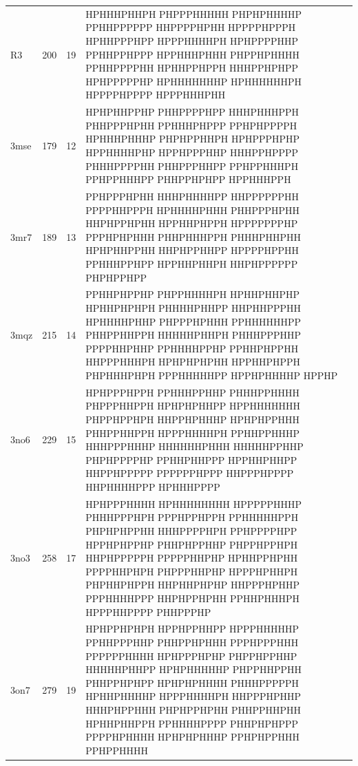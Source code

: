 \begin{center}
\begin{tabular}{@{}lrr>{\raggedright\arraybackslash}p{}@{}}
R3 & 200 & 19 & {\ttfamily\footnotesize HPHHHPHHPH PHPPPHHHHH PHPHPHHHHP PPHHPPPPPP HHPPPPHPHH HPPPPHPPPH HPHHPPPHPP HPPPHHHHPH HPHPPPPHHP PPHHPPHPPP HPPHHHPHHH PHPPHPHHHH PPHHPPPPHH HPHHPPHPPH HHHPPHPHPP HPHPPPPPHP HPHHHHHHHP HPHHHHHHPH HPPPPHPPPP HPPPHHHPHH} \\[3pt]
3mse & 179 & 12 & {\ttfamily\footnotesize HPHPHHPPHP PHHPPPPHPP HHHPHHHPPH PHHPPPHPHH PPHHHPHPPP PPHPHPPPPH HPHHHPHHHP PHPHPPHHPH HPHPPPHPHP HPPHHHHPHP HPPHPPPHHP HHHPPHPPPP PHHHPPPPHH PHHPPPHHPP PPHPPHHHPH PPHPPHHHPP PHHPPHPHPP HPPHHHPPH} \\[3pt]
3mr7 & 189 & 13 & {\ttfamily\footnotesize PPHPPPHPHH HHHPHHHHPP HHPPPPPPHH PPPPHHPPPH HPHHHHPHHH PHHPPPHPHH HHPHPPHPHH HPPHHPHPPH HPPPPPPPHP PPPHPHPHHH PHHPHHHPPH PHHHPHHPHH HPHPHHPPHH HHPHPPHHPP HPPPPHPPHH PPHHHPPHPP HPPHHPHHPH HHPHPPPPPP PHPHPPHPP} \\[3pt]
3mqz & 215 & 14 & {\ttfamily\footnotesize PPHHPHPPHP PHPPHHHHPH HPHHPHHPHP HPHHPHPHPH PHHHHPHHPP HHPHHPPPHH HPHHHHPHHP PHPPPHPHHH PPHHHHHHPP PHHPPHHPPH HHHHHPHHPH PHHHPPPHHP PPPPHHPHHP PPHHHHPPHP PPHHPHPPHH HHPPPHHHPH HPHPHPHPHH HPPHHPHPPH PHPHHHPHPH PPPHHHHHPP HPPHPHHHHP HPPHP} \\[3pt]
3no6 & 229 & 15 & {\ttfamily\footnotesize HPHPPPHPPH PPHHHPPHHP PHHHPPHHHH PHPPPHHPPH HPHPHPHHPP HPPHHHHHHH PHPPHPPHPH HHPPHPHHHP HPHPHPPHHH PHHPPHHPPH HPPPHHHHPH PPHHPPHHHP HHHPPPHHHP HHHHHHPHHH HHHHHPPHHP PHPHPPPPHP PPHHPHHPPP HPPHHPHHPP HHPPHPPPPP PPPPPPHPPP HHPPPHPPPP HHPHHHHPPP HPHHHPPPP} \\[3pt]
3no3 & 258 & 17 & {\ttfamily\footnotesize HPHPPPHHHH HPHHHHHHHH HPPPPPHHHP PHHHPPPHPH PPPHPPHPPH PPHHHHHPPH PHPHPHPPHH HHHPPPPHPH PPHPPPPHPP HPPHPHPPHP PHHPHPPHHP PHPPHPPHPH HHPHPPPPPH PPPPPHHPHP HPHHPPHPHH PPPPHHPHPH PHPPPHHPHP HPPPHPHHPH PHPHHPHPPH HHPHHPHPHP HHPPPHPHHP PPPHHHHPPP HHPHPPHPHH PPHHPHHHPH HPPPHHPPPP PHHPPPHP} \\[3pt]
3on7 & 279 & 19 & {\ttfamily\footnotesize HPHPPHPHPH HPPHPPHHPP HPPPHHHHHP PPHHPPPHHP PHHPPHPHHH PPPHPPPHHH PPPPPPHHHH HPHPPPHPHP PHPPHPPHHP HHHHHPHHPP HPHPHHHHHP PHPPHHPPHH PHHPPHPHPP HPHPHPHHHH PHHHPPPPPH HPHHPHHHHP HPPPHHHHPH HHPPPHPHHP HHHPHPPHHH PHPHPPHPHH PHHPPHHPHH HPHHPHHPPH PPHHHHPPPP PHHPHPHPPP PPPPHPHHHH HPHPHPHHHP PPHPHPPHHH PPHPPHHHH} \\[3pt]
\bottomrule
\end{tabular}
\end{center}
